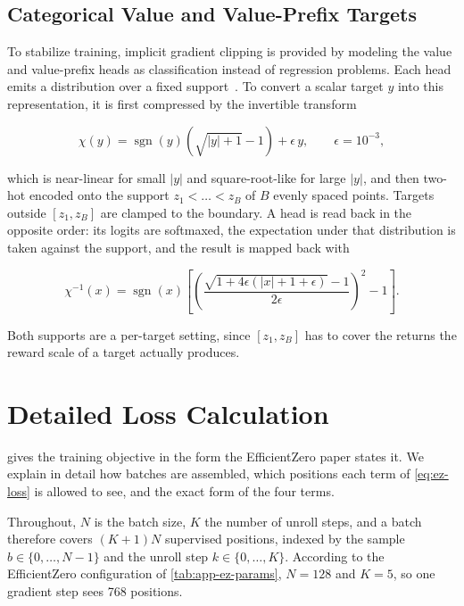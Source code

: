 \section{Categorical Value and Value-Prefix Targets}\label{sec:app-ez-categorical}

To stabilize training, implicit gradient clipping is provided by modeling the value and value-prefix heads
as classification instead of regression problems.
Each head emits a distribution over a fixed support~\cite{schrittwieser_mastering_2020,ye_mastering_2021}.
To convert a scalar target $y$ into this representation, it is first compressed by the invertible transform

\begin{equation}\label{eq:app-scalar-transform}
  \chi(y)=\operatorname{sgn}(y)\left(\sqrt{|y|+1}-1\right)+\epsilon\,y,
  \qquad \epsilon=10^{-3},
\end{equation}

which is near-linear for small $|y|$ and square-root-like for large $|y|$,
and then two-hot encoded onto the support $z_1<\dots<z_B$ of $B$ evenly spaced points.
Targets outside $[z_1,z_B]$ are clamped to the boundary.
A head is read back in the opposite order: its logits are softmaxed, the expectation under that
distribution is taken against the support, and the result is mapped back with

\begin{equation}\label{eq:app-scalar-transform-inverse}
  \chi^{-1}(x)=\operatorname{sgn}(x)\left[
    \left(\frac{\sqrt{1+4\epsilon\left(|x|+1+\epsilon\right)}-1}{2\epsilon}\right)^{2}-1
  \right].
\end{equation}

Both supports are a per-target setting, since $[z_1,z_B]$ has to cover the returns the reward scale
of a target actually produces.

\chapter{Detailed Loss Calculation}\label{app:loss}

 gives the training objective in the form the EfficientZero paper states it.
We explain in detail how batches are assembled, which positions each
term of \cref{eq:ez-loss} is allowed to see, and the exact form of the four terms.

Throughout, $N$ is the batch size, $K$ the number of unroll steps, and a batch therefore covers
$(K+1)N$ supervised positions, indexed by the sample $b\in\{0,\dots,N-1\}$ and the unroll step
$k\in\{0,\dots,K\}$.
According to the EfficientZero configuration of \cref{tab:app-ez-params}, $N=128$ and $K=5$, so one gradient step
sees 768 positions.

